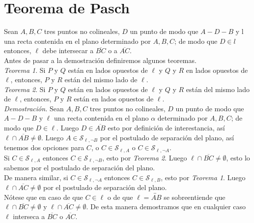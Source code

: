 \documentclass[11pt]{article}
\begin{document}
\section*{Teorema de Pasch}
    Sean $A, B, C$ tres puntos no colineales, $D$ un punto de modo que $A-D-B$ y l una recta contenida en el plano determinado por $A, B, C$; de modo que $D \in l$ entonces, $\ell$ debe intersecar a $\overline{BC}$ o a $\overline{AC}$.\\

    \noindent Antes de pasar a la demostración definiremos algunos teoremas.\\

    \noindent \textit{Teorema 1}. Si $P$ y $Q$ están en lados opuestos de $\ell$ y $Q$ y $R$ en lados opuestos de $\ell$, entonces, $P$ y $R$ están del mismo lado de $\ell$.\\

    \noindent \textit{Teorema 2}. Si $P$ y $Q$ están en lados opuestos de $\ell$ y $Q$ y $R$ están del mismo lado de $\ell$, entonces, $P$ y $R$ están en lados opuestos de $\ell$.\\

    \noindent \textit{Demostración.} Sean $A, B, C$ tres puntos no colineales, $D$ un punto de modo que $A-D-B$ y $\ell$ una recta contenida en el plano $\alpha$ determinado por $A, B, C$; de modo que $D \in \ell$. Luego $D \in \overline{AB}$ esto por definición de interestancia, así $\ell \cap \overline{AB} \not = \emptyset$. Luego $A \in \mathcal{S}_{\ell, \neg B}$ por el postulado de separación del plano, así tenemos dos opciones para $C$, o $C \in \mathcal{S}_{\ell, A}$ o $C \in \mathcal{S}_{\ell, \neg A}$.\\

    \noindent Si $C \in \mathcal{S}_{\ell, A}$ entonces $C \in \mathcal{S}_{\ell, \neg B}$, esto por \textit{Teorema 2}. Luego $\ell \cap \overline{BC} \not = \emptyset$, esto lo sabemos por el postulado de separación del plano.\\

    \noindent De manera similar, si $C \in \mathcal{S}_{\ell, \neg A}$ entonces $C \in \mathcal{S}_{\ell, B}$, esto por \textit{Teorema 1}. Luego $\ell \cap \overline{AC} \not = \emptyset$ por el postulado de separación del plano.\\

    \noindent Nótese que en caso de que $C \in \ell$ o de que $\ell = \overleftrightarrow{AB}$ se sobreentiende que $\ell \cap \overline{BC} \not = \emptyset$ y $\ell \cap \overline{AC} \not = \emptyset$. De esta manera demostramos que en cualquier caso $\ell$ interseca a $\overline{BC}$ o $\overline{AC}$.
\end{document}
